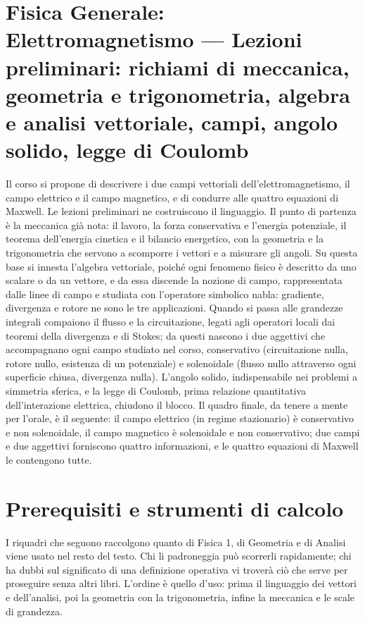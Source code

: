 \documentclass[main.tex]{subfiles}
\begin{document}
\renewcommand{\richiamoprefix}{}


\section*{Fisica Generale: Elettromagnetismo --- Lezioni preliminari: richiami di meccanica, geometria e trigonometria, algebra e analisi vettoriale, campi, angolo solido, legge di Coulomb}

Il corso si propone di descrivere i due campi vettoriali dell'elettromagnetismo, il campo elettrico e il campo magnetico, e di condurre alle quattro equazioni di Maxwell. Le lezioni preliminari ne costruiscono il linguaggio. Il punto di partenza è la meccanica già nota: il lavoro, la forza conservativa e l'energia potenziale, il teorema dell'energia cinetica e il bilancio energetico, con la geometria e la trigonometria che servono a scomporre i vettori e a misurare gli angoli. Su questa base si innesta l'algebra vettoriale, poiché ogni fenomeno fisico è descritto da uno scalare o da un vettore, e da essa discende la nozione di campo, rappresentata dalle linee di campo e studiata con l'operatore simbolico nabla: gradiente, divergenza e rotore ne sono le tre applicazioni. Quando si passa alle grandezze integrali compaiono il flusso e la circuitazione, legati agli operatori locali dai teoremi della divergenza e di Stokes; da questi nascono i due aggettivi che accompagnano ogni campo studiato nel corso, conservativo (circuitazione nulla, rotore nullo, esistenza di un potenziale) e solenoidale (flusso nullo attraverso ogni superficie chiusa, divergenza nulla). L'angolo solido, indispensabile nei problemi a simmetria sferica, e la legge di Coulomb, prima relazione quantitativa dell'interazione elettrica, chiudono il blocco. Il quadro finale, da tenere a mente per l'orale, è il seguente: il campo elettrico (in regime stazionario) è conservativo e non solenoidale, il campo magnetico è solenoidale e non conservativo; due campi e due aggettivi forniscono quattro informazioni, e le quattro equazioni di Maxwell le contengono tutte.

\medskip

\section*{Prerequisiti e strumenti di calcolo}
I riquadri che seguono raccolgono quanto di Fisica 1, di Geometria e di Analisi viene usato nel resto del testo. Chi li padroneggia può scorrerli rapidamente; chi ha dubbi sul significato di una definizione operativa vi troverà ciò che serve per proseguire senza altri libri. L'ordine è quello d'uso: prima il linguaggio dei vettori e dell'analisi, poi la geometria con la trigonometria, infine la meccanica e le scale di grandezza.
\end{document}
